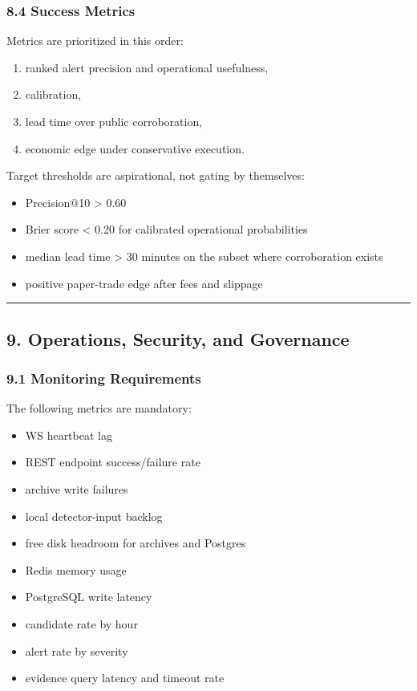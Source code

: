 \documentclass[
]{article}
\providecommand{\tightlist}{%
  \setlength{\itemsep}{0pt}\setlength{\parskip}{0pt}}
\begin{document}
\subsubsection{8.4 Success Metrics}\label{84-success-metrics}

Metrics are prioritized in this order:

\begin{enumerate}
\def\labelenumi{\arabic{enumi}.}
\tightlist
\item
  ranked alert precision and operational usefulness,
\item
  calibration,
\item
  lead time over public corroboration,
\item
  economic edge under conservative execution.
\end{enumerate}

Target thresholds are aspirational, not gating by themselves:

\begin{itemize}
\tightlist
\item
  Precision@10 \textgreater{} 0.60
\item
  Brier score \textless{} 0.20 for calibrated operational probabilities
\item
  median lead time \textgreater{} 30 minutes on the subset where
  corroboration exists
\item
  positive paper-trade edge after fees and slippage
\end{itemize}

\begin{center}\rule{0.5\linewidth}{0.5pt}\end{center}

\subsection{9. Operations, Security, and
Governance}\label{9-operations-security-and-governance}

\subsubsection{9.1 Monitoring
Requirements}\label{91-monitoring-requirements}

The following metrics are mandatory:

\begin{itemize}
\tightlist
\item
  WS heartbeat lag
\item
  REST endpoint success/failure rate
\item
  archive write failures
\item
  local detector-input backlog
\item
  free disk headroom for archives and Postgres
\item
  Redis memory usage
\item
  PostgreSQL write latency
\item
  candidate rate by hour
\item
  alert rate by severity
\item
  evidence query latency and timeout rate
\end{itemize}
\end{document}
